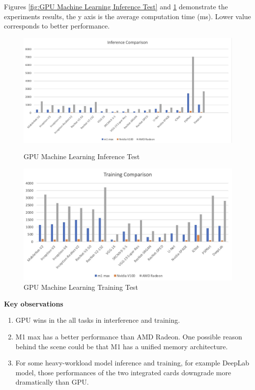 \documentclass[11pt]{article}
\begin{document}
Figures \ref{fig:GPU Machine Learning Inference Test} and \ref{fig:GPU Machine Learning Training Test} demonstrate the experiments results, the y axis is the average computation time (ms). Lower value corresponds to better performance.

\begin{figure}
    \centering
    \includegraphics[scale = 0.4]{gpu_inference.jpg}
    \caption{GPU Machine Learning Inference Test}
	\label{fig:GPU Machine Learning Inference Test}
	
	\centering
    \includegraphics[scale = 0.4]{gpu_training.jpg}
    \caption{GPU Machine Learning Training Test}
	\label{fig:GPU Machine Learning Training Test}
\end{figure}

\textbf{Key observations}

\begin{enumerate}
  \item GPU wins in the all tasks in interference and training.
  \item M1 max has a better performance than AMD Radeon. One possible reason behind the scene could be that M1 has a unified memory architecture.
  \item For some heavy-workload model inference and training, for example DeepLab model, those performances of the two integrated cards downgrade more dramatically than GPU.
\end{enumerate}
\end{document}
